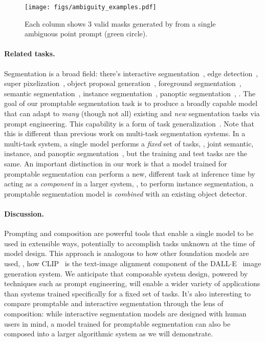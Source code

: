 \begin{figure}[t]\centering
\texttt{[image: figs/ambiguity\_examples.pdf]}\vspace{-1mm}
\caption{Each column shows 3 valid masks generated by \sam from a single ambiguous point prompt (green circle).}
\label{fig:ambiguity_examples}\vspace{-1mm}
\end{figure}

\paragraph{Related tasks.} Segmentation is a broad field: there's interactive segmentation~\cite{kass1988snakes,xu2016deep}, edge detection~\cite{arbelaez2010contour}, super pixelization~\cite{ren2003learning}, object proposal generation~\cite{alexe2010object}, foreground segmentation~\cite{stauffer1999adaptive}, semantic segmentation~\cite{shotton2006textonboost}, instance segmentation~\cite{Lin2014}, panoptic segmentation~\cite{kirillov2019panoptic}, \etc. The goal of our promptable segmentation task is to produce a broadly capable model that can adapt to \emph{many} (though not all) existing and \emph{new} segmentation tasks via prompt engineering. This capability is a form of task generalization~\cite{da2012learning}. Note that this is different than previous work on multi-task segmentation systems. In a multi-task system, a single model performs a \emph{fixed} set of tasks, \eg, joint semantic, instance, and panoptic segmentation~\cite{zhang2021knet,cheng2022masked,jain2022oneformer}, but the training and test tasks are the same. An important distinction in our work is that a model trained for promptable segmentation can perform a new, different task at inference time by acting as a \emph{component} in a larger system, \eg, to perform instance segmentation, a promptable segmentation model is \emph{combined} with an existing object detector.

\paragraph{Discussion.} Prompting and composition are powerful tools that enable a single model to be used in extensible ways, potentially to accomplish tasks unknown at the time of model design. This approach is analogous to how other foundation models are used, \eg, how CLIP~\cite{Radford2021} is the text-image alignment component of the DALL$\cdot$E~\cite{Ramesh2021} image generation system. We anticipate that composable system design, powered by techniques such as prompt engineering, will enable a wider variety of applications than systems trained specifically for a fixed set of tasks. It's also interesting to compare promptable and interactive segmentation through the lens of composition: while interactive segmentation models are designed with human users in mind, a model trained for promptable segmentation can also be composed into a larger algorithmic system as we will demonstrate.


